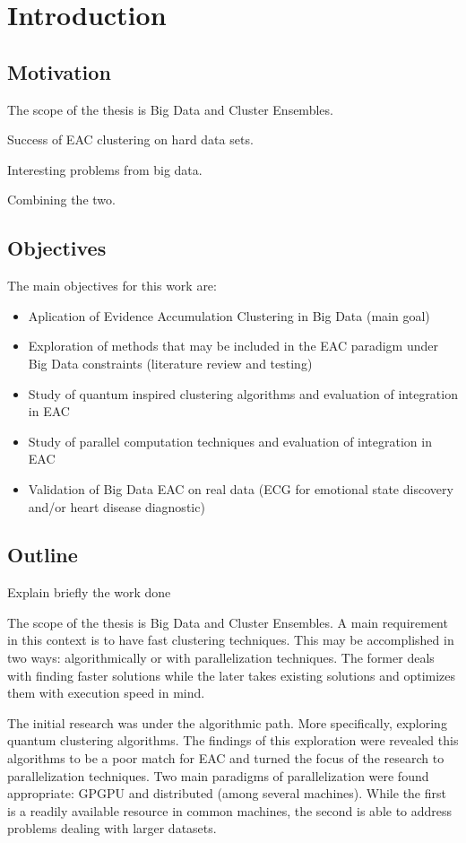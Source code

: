 \section{Introduction}
\label{intro}
\subsection{Motivation}
The scope of the thesis is Big Data and Cluster Ensembles.

Success of EAC clustering on hard data sets.

Interesting problems from big data.

Combining the two.

\subsection{Objectives}
The main objectives for this work are:
\begin{itemize}
\item Aplication of Evidence Accumulation Clustering in Big Data (main goal)
\item Exploration of methods that may be included in the EAC paradigm under Big Data constraints (literature review and testing)
\item Study of quantum inspired clustering algorithms and evaluation  of integration in EAC 
\item Study of parallel computation techniques and evaluation of integration in EAC
\item Validation of Big Data EAC on real data (ECG for emotional state discovery and/or heart disease diagnostic)
\end{itemize}

\subsection{Outline}

Explain briefly the work done

The scope of the thesis is Big Data and Cluster Ensembles. A main requirement in this context is to have fast clustering techniques. This may be accomplished in two ways: algorithmically or with parallelization techniques. The former deals with finding faster solutions while the later takes existing solutions and optimizes them with execution speed in mind.

The initial research was under the algorithmic path. More specifically, exploring quantum clustering algorithms. The findings of this exploration were revealed this algorithms to be a poor match for EAC and turned the focus of the research to parallelization techniques. Two main paradigms of parallelization were found appropriate: GPGPU and distributed (among several machines). While the first is a readily available resource in common machines, the second is able to address problems dealing with larger datasets.

